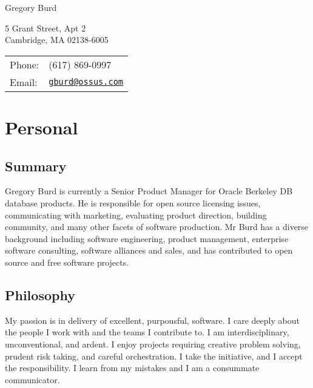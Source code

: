 \documentclass[letterpaper]{article}
\def\name{Gregory Burd}
\renewenvironment{itemize}{
  \begin{list}{}{
    \setlength{\leftmargin}{1.5em}
  }
}{
  \end{list}
}
\begin{document}
{\huge \name}


\vspace{0.25in}

\begin{minipage}{0.45\linewidth}
  5 Grant Street, Apt 2 \\
  Cambridge, MA 02138-6005
\end{minipage}
\begin{minipage}{0.45\linewidth}
  \begin{tabular}{ll}
    Phone: & (617) 869-0997 \\
    Email: & \href{mailto:gburd@ossus.com}{\tt gburd@ossus.com} \\
  \end{tabular}
\end{minipage}


\section*{Personal}

\subsection*{Summary}

\begin{itemize}
\item Gregory Burd is currently a Senior Product Manager for Oracle Berkeley DB database products. He is responsible for open source licensing issues, communicating with marketing, evaluating product direction, building community, and many other facets of software production. Mr Burd has a diverse background including software engineering, product management, enterprise software consulting, software alliances and sales, and has contributed to open source and free software projects.
\end{itemize}

\subsection*{Philosophy}
\begin{itemize}
\item My passion is in delivery of excellent, purpousful, software. I care deeply about the people I work with and the teams I contribute to. I am interdisciplinary, unconventional, and ardent. I enjoy projects requiring creative problem solving, prudent risk taking, and careful orchestration. I take the initiative, and I accept the responsibility. I learn from my mistakes and I am a consummate communicator.
\end{itemize}
\end{document}
